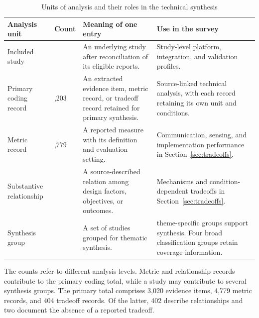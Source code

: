 \begin{table}[!t]
\caption{Units of analysis and their roles in the technical synthesis}
\label{tab:evidence_reconciliation}
\centering
\begingroup
\footnotesize
\setlength{\tabcolsep}{4pt}
\renewcommand{\arraystretch}{1.12}
\begin{tabularx}{\textwidth}{@{}
>{\raggedright\arraybackslash}p{}
>{\raggedleft\arraybackslash}p{}
>{\raggedright\arraybackslash}p{}
>{\raggedright\arraybackslash}X@{}}
\toprule
\textbf{Analysis unit} & \textbf{Count} &
\textbf{Meaning of one entry} & \textbf{Use in the survey} \\
\midrule
Included study & 206 &
An underlying study after reconciliation of its eligible reports. &
Study-level platform, integration, and validation profiles. \\
\addlinespace[3pt]
Primary coding record & 8,203 &
An extracted evidence item, metric record, or tradeoff record retained for
primary synthesis. &
Source-linked technical analysis, with each record retaining its own unit
and conditions. \\
\addlinespace[3pt]
Metric record & 4,779 &
A reported measure with its definition and evaluation setting. &
Communication, sensing, and implementation performance in
Section~\ref{sec:tradeoffs}. \\
\addlinespace[3pt]
Substantive relationship & 402 &
A source-described relation among design factors, objectives, or outcomes. &
Mechanisms and condition-dependent tradeoffs in
Section~\ref{sec:tradeoffs}. \\
\addlinespace[3pt]
Synthesis group & 115 &
A set of studies grouped for thematic synthesis. &
111 theme-specific groups support synthesis. Four broad classification
groups retain coverage information. \\
\bottomrule
\end{tabularx}
\par\vspace{3pt}
\noindent\parbox{\textwidth}{\raggedright\footnotesize
The counts refer to different analysis levels. Metric and relationship records
contribute to the primary coding total, while a study may contribute to several
synthesis groups. The primary total comprises 3,020 evidence items,
4,779 metric records, and 404 tradeoff records. Of the latter, 402 describe
relationships and two document the absence of a reported tradeoff.\par}
\endgroup
\end{table}

